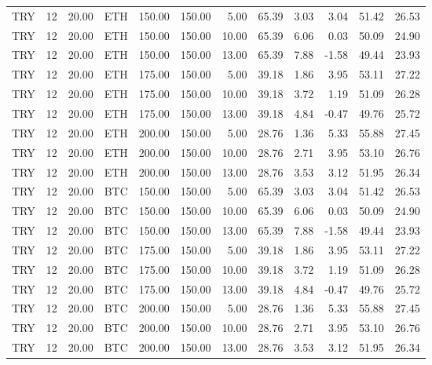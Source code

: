 \begin{tabular}{lrrrrrrrrrrr}
TRY & 12 & 20.00 & ETH & 150.00 & 150.00 & 5.00 & 65.39 & 3.03 & 3.04 & 51.42 & 26.53 \\
TRY & 12 & 20.00 & ETH & 150.00 & 150.00 & 10.00 & 65.39 & 6.06 & 0.03 & 50.09 & 24.90 \\
TRY & 12 & 20.00 & ETH & 150.00 & 150.00 & 13.00 & 65.39 & 7.88 & -1.58 & 49.44 & 23.93 \\
TRY & 12 & 20.00 & ETH & 175.00 & 150.00 & 5.00 & 39.18 & 1.86 & 3.95 & 53.11 & 27.22 \\
TRY & 12 & 20.00 & ETH & 175.00 & 150.00 & 10.00 & 39.18 & 3.72 & 1.19 & 51.09 & 26.28 \\
TRY & 12 & 20.00 & ETH & 175.00 & 150.00 & 13.00 & 39.18 & 4.84 & -0.47 & 49.76 & 25.72 \\
TRY & 12 & 20.00 & ETH & 200.00 & 150.00 & 5.00 & 28.76 & 1.36 & 5.33 & 55.88 & 27.45 \\
TRY & 12 & 20.00 & ETH & 200.00 & 150.00 & 10.00 & 28.76 & 2.71 & 3.95 & 53.10 & 26.76 \\
TRY & 12 & 20.00 & ETH & 200.00 & 150.00 & 13.00 & 28.76 & 3.53 & 3.12 & 51.95 & 26.34 \\
TRY & 12 & 20.00 & BTC & 150.00 & 150.00 & 5.00 & 65.39 & 3.03 & 3.04 & 51.42 & 26.53 \\
TRY & 12 & 20.00 & BTC & 150.00 & 150.00 & 10.00 & 65.39 & 6.06 & 0.03 & 50.09 & 24.90 \\
TRY & 12 & 20.00 & BTC & 150.00 & 150.00 & 13.00 & 65.39 & 7.88 & -1.58 & 49.44 & 23.93 \\
TRY & 12 & 20.00 & BTC & 175.00 & 150.00 & 5.00 & 39.18 & 1.86 & 3.95 & 53.11 & 27.22 \\
TRY & 12 & 20.00 & BTC & 175.00 & 150.00 & 10.00 & 39.18 & 3.72 & 1.19 & 51.09 & 26.28 \\
TRY & 12 & 20.00 & BTC & 175.00 & 150.00 & 13.00 & 39.18 & 4.84 & -0.47 & 49.76 & 25.72 \\
TRY & 12 & 20.00 & BTC & 200.00 & 150.00 & 5.00 & 28.76 & 1.36 & 5.33 & 55.88 & 27.45 \\
TRY & 12 & 20.00 & BTC & 200.00 & 150.00 & 10.00 & 28.76 & 2.71 & 3.95 & 53.10 & 26.76 \\
TRY & 12 & 20.00 & BTC & 200.00 & 150.00 & 13.00 & 28.76 & 3.53 & 3.12 & 51.95 & 26.34 \\
\bottomrule
\end{tabular}
